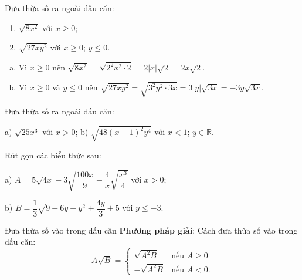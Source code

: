 \begin{vd}
Đưa thừa số ra ngoài dấu căn:
\begin{multicols}{2}
	\begin{enumerate}
		\item $\sqrt{8x^2}$ với $x\ge 0$;
		\item $\sqrt{27xy^2}$ với $x\ge 0$; $y\le 0$.
	\end{enumerate}
\end{multicols}

    \loigiai
    {
    	\begin{enumerate}[a)]
    		\item Vì $x\ge 0$ nên $\sqrt{8x^2}=\sqrt{2^2x^2\cdot 2}=2|x|\sqrt{2}=2x\sqrt{2}.$
    		\item Vì $x\ge 0$ và $y\le 0$ nên $\sqrt{27xy^2}=\sqrt{3^2y^2\cdot 3x}=3|y|\sqrt{3x}=-3y\sqrt{3x}.$
    	\end{enumerate}
    }
\end{vd}

\begin{vd}
Đưa thừa số ra ngoài dấu căn:

a) $\sqrt{25x^3}$ với $x> 0$;\hspace*{3cm} b) $\sqrt{48(x-1)^2y^4}$ với $x<1$; $y\in\mathbb{R}$.
\end{vd}

\begin{vd}
Rút gọn các biểu thức sau:

a) $A=5\sqrt{4x}-3\sqrt{\dfrac{100x}{9}}-\dfrac{4}{x}\sqrt{\dfrac{x^3}{4}}$ với $x> 0$;

b) $B=\dfrac{1}{3}\sqrt{9+6y+y^2}+\dfrac{4y}{3}+5$ với $y\le -3$.
\end{vd}
\begin{dang}{Đưa thừa số vào trong dấu căn}
    \textbf{Phương pháp giải}: Cách đưa thừa số vào trong dấu căn:
$$A\sqrt{B}=\begin{cases}
\sqrt{A^2B} &\text{nếu } A\ge 0\\
-\sqrt{A^2B} &\text{nếu } A<0.
\end{cases}$$
\end{dang}

